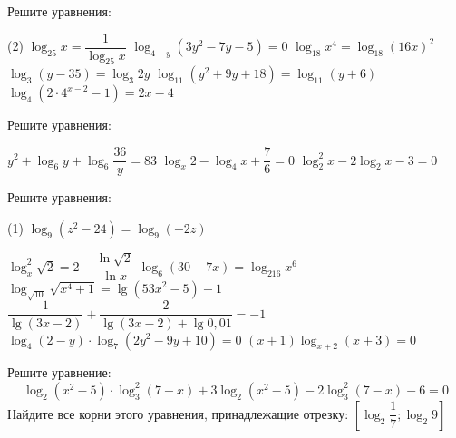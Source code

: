 \begin{homework}[number=2]
	\begin{listofex}
		\item Решите уравнения:
		\begin{tasks}(2) %
			\task \( \log_{25}x=\dfrac{ 1 }{ \log_{25}x } \)
			\task \( \log_{4-y}(3y^2-7y-5)=0 \)
			\task \( \log_{18}x^4 = \log_{18}(16x)^2 \)
			\task \( \log_{3}(y-35)=\log_{3}2y \)
			\task \( \log_{11}(y^2+9y+18)=\log_{11}(y+6) \)
			\task \( \log_4 (2 \cdot 4^{x-2}-1)=2x-4 \)
		\end{tasks}
		\item Решите уравнения:
		\begin{tasks}
			\task \( y^2+\log_{6}y+\log_{6}\dfrac{ 36 }{ y }=83 \)
			\task \( \log_x 2 - \log_4 x + \dfrac{7}{6} = 0 \)
			\task \( \log_2^2 x - 2\log_2 x -3 =0 \)
		\end{tasks}
		
	\end{listofex}
\end{homework}

\begin{class}[number=5]
	\begin{listofex}
		\item Решите уравнения: %
		\begin{tasks}(1)
			\task \( \log_9(z^2-24)=\log_9(-2z) \)
			
			\task \( \log ^2 _x \sqrt{2} = 2 - \dfrac{ \ln \sqrt{2} }{ \ln x } \)
			\task \( \log_6(30-7x)=\log_{216}x^6 \)
			\task \( \log_{\sqrt{10}} \sqrt{x^4+1} = \lg (53x^2-5)-1 \)
			\task \( \dfrac{ 1 }{ \lg (3x-2) } + \dfrac{ 2 }{ \lg (3x-2) + \lg 0,01 } = -1 \)
			\task \( \log_4 (2-y) \cdot \log_7 (2y^2-9y+10) = 0 \)
			\task \( (x+1)\log_{x+2}(x+3)=0 \)
		\end{tasks}
		\item %
		\begin{tasks}
			\task Решите уравнение: \[ \log_2(x^2-5) \cdot \log_3^2(7-x) + 3\log_2(x^2-5)-2\log_3^2(7-x)-6=0 \]
			\task Найдите все корни этого уравнения, принадлежащие отрезку: \( \left[ \log_2 \dfrac{1}{7}; \log_2 9 \right]  \)
		\end{tasks}
	\end{listofex}
\end{class}

